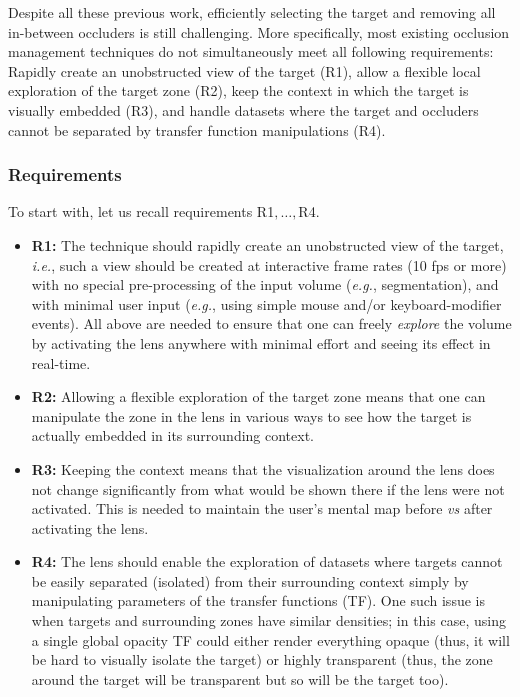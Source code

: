 Despite all these previous work, efficiently selecting the target and  removing all in-between occluders is still challenging. More specifically, most existing occlusion management techniques do not simultaneously meet all following requirements: Rapidly create an unobstructed view of the target (R1), allow a flexible local exploration of the target zone (R2), keep the context in which the target is visually embedded (R3), and handle datasets where the target and occluders cannot 
be separated by transfer function manipulations (R4).

\subsubsection{Requirements}

To start with, let us recall requirements R1$,\ldots,$R4.
\begin{itemize}
\item{\textbf{R1:}} The technique should rapidly create an unobstructed view of the target, \emph{i.e.}, such a view should be created at interactive frame rates (10 fps or more) with no special pre-processing of the input volume (\emph{e.g.}, segmentation), and with minimal user input (\emph{e.g.}, using simple mouse and/or keyboard-modifier events). All above are needed to ensure that one can freely \emph{explore} the volume by activating the lens anywhere with minimal effort and seeing its effect in real-time.

\item{\textbf{R2:}} Allowing a flexible exploration of the target zone means that one can manipulate the zone in the lens in various ways to see how the target is actually embedded in its surrounding context.

\item{\textbf{R3:}} Keeping the context means that the visualization around the lens does not change significantly from what would be shown there if the lens were not activated. This is needed to maintain the user's mental map before \emph{vs} after activating the lens.

\item{\textbf{R4:}} The lens should enable the exploration of datasets where targets cannot be easily separated (isolated) from their surrounding context simply by manipulating parameters of the transfer functions (TF). One such issue is when targets and surrounding zones have similar densities; in this case, using a single global opacity TF could either render everything opaque (thus, it will be hard to visually isolate the target) or highly transparent (thus, the zone around the target will be transparent but so will be the target too).
\end{itemize}


